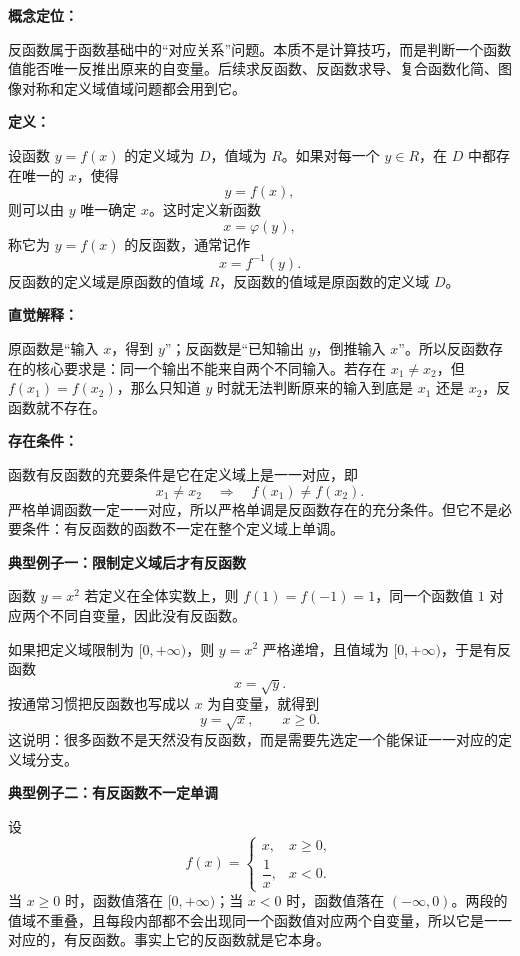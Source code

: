 \par

\begin{knowledgeBox}
\textbf{概念定位：}

反函数属于函数基础中的“对应关系”问题。本质不是计算技巧，而是判断一个函数值能否唯一反推出原来的自变量。后续求反函数、反函数求导、复合函数化简、图像对称和定义域值域问题都会用到它。

\textbf{定义：}

设函数 \(y=f(x)\) 的定义域为 \(D\)，值域为 \(R\)。如果对每一个 \(y\in R\)，在 \(D\) 中都存在唯一的 \(x\)，使得
\[
y=f(x),
\]
则可以由 \(y\) 唯一确定 \(x\)。这时定义新函数
\[
x=\varphi(y),
\]
称它为 \(y=f(x)\) 的反函数，通常记作
\[
x=f^{-1}(y).
\]
反函数的定义域是原函数的值域 \(R\)，反函数的值域是原函数的定义域 \(D\)。

\textbf{直觉解释：}

原函数是“输入 \(x\)，得到 \(y\)”；反函数是“已知输出 \(y\)，倒推输入 \(x\)”。所以反函数存在的核心要求是：同一个输出不能来自两个不同输入。若存在 \(x_1\ne x_2\)，但 \(f(x_1)=f(x_2)\)，那么只知道 \(y\) 时就无法判断原来的输入到底是 \(x_1\) 还是 \(x_2\)，反函数就不存在。

\textbf{存在条件：}

函数有反函数的充要条件是它在定义域上是一一对应，即
\[
x_1\ne x_2\quad\Longrightarrow\quad f(x_1)\ne f(x_2).
\]
严格单调函数一定一一对应，所以严格单调是反函数存在的充分条件。但它不是必要条件：有反函数的函数不一定在整个定义域上单调。

\textbf{典型例子一：限制定义域后才有反函数}

函数 \(y=x^2\) 若定义在全体实数上，则 \(f(1)=f(-1)=1\)，同一个函数值 \(1\) 对应两个不同自变量，因此没有反函数。

如果把定义域限制为 \([0,+\infty)\)，则 \(y=x^2\) 严格递增，且值域为 \([0,+\infty)\)，于是有反函数
\[
x=\sqrt{y}.
\]
按通常习惯把反函数也写成以 \(x\) 为自变量，就得到
\[
y=\sqrt{x},\qquad x\ge 0.
\]
这说明：很多函数不是天然没有反函数，而是需要先选定一个能保证一一对应的定义域分支。

\textbf{典型例子二：有反函数不一定单调}

设
\[
f(x)=
\begin{cases}
x, & x\ge 0,\\
\dfrac{1}{x}, & x<0.
\end{cases}
\]
当 \(x\ge 0\) 时，函数值落在 \([0,+\infty)\)；当 \(x<0\) 时，函数值落在 \((-\infty,0)\)。两段的值域不重叠，且每段内部都不会出现同一个函数值对应两个自变量，所以它是一一对应的，有反函数。事实上它的反函数就是它本身。


\end{knowledgeBox}

